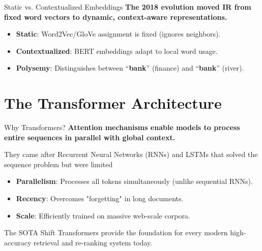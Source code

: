 \documentclass[aspectratio=169]{beamer}
\newif\ifanimated
\newcommand{\cpause}{\ifanimated\pause\fi}
\begin{document}
\begin{frame}{Static vs. Contextualized Embeddings}
\textbf{The 2018 evolution moved IR from fixed word vectors to dynamic, context-aware representations.}

\vspace{0.8em}
\begin{itemize}
    \item \textbf{Static}: Word2Vec/GloVe assignment is fixed (ignores neighbors).
    \item \textbf{Contextualized}: BERT embeddings adapt to local word usage.
    \item \textbf{Polysemy}: Distinguishes between ``\textbf{bank}'' (finance) and ``\textbf{bank}'' (river).
\end{itemize}

\vspace{0.5em}
\begin{center}

\end{center}
\end{frame}

\section{The Transformer Architecture}

\begin{frame}[plain]
\sectionpage
\end{frame}

\begin{frame}{Why Transformers?}
\textbf{Attention mechanisms enable models to process entire sequences in parallel with global context.}

\vspace{0.8em}

They came after Recurrent Neural Networks (RNNs) and LSTMs that solved the sequence problem but were limited

\begin{itemize}
    \item \textbf{Parallelism}: Processes all tokens simultaneously (unlike sequential RNNs).
    \item \textbf{Recency}: Overcomes "forgetting" in long documents.
    \item \textbf{Scale}: Efficiently trained on massive web-scale corpora.
\end{itemize}

\vspace{1em}
\cpause
\begin{exampleblock}{The SOTA Shift}
Transformers provide the foundation for every modern high-accuracy retrieval and re-ranking system today.
\end{exampleblock}
\end{frame}
\end{document}
